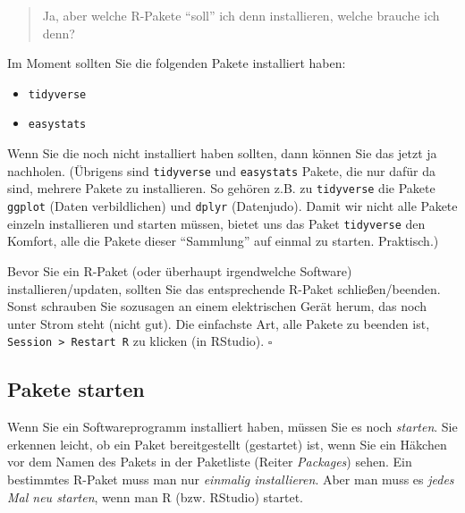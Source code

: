 \documentclass[
  letterpaper,
  oneside,
  open=any]{scrbook}
\providecommand{\tightlist}{%
  \setlength{\itemsep}{0pt}\setlength{\parskip}{0pt}}\usepackage{longtable,booktabs,array}
\theoremstyle{definition}
\theoremstyle{definition}
\theoremstyle{definition}
\theoremstyle{remark}
\begin{document}
\begin{quote}
{} Ja, aber welche R-Pakete \enquote{soll} ich denn
installieren, welche brauche ich denn?
\end{quote}

Im Moment sollten Sie die folgenden Pakete installiert haben:

\begin{itemize}
\tightlist
\item
  \texttt{tidyverse}
\item
  \texttt{easystats}
\end{itemize}

Wenn Sie die noch nicht installiert haben sollten, dann können Sie das
jetzt ja nachholen. (Übrigens sind \texttt{tidyverse} und
\texttt{easystats} Pakete, die nur dafür da sind, mehrere Pakete zu
installieren. So gehören z.B. zu \texttt{tidyverse} die Pakete
\texttt{ggplot} (Daten verbildlichen) und \texttt{dplyr} (Datenjudo).
Damit wir nicht alle Pakete einzeln installieren und starten müssen,
bietet uns das Paket \texttt{tidyverse} den Komfort, alle die Pakete
dieser \enquote{Sammlung} auf einmal zu starten. Praktisch.)

\begin{tcolorbox}[enhanced jigsaw, bottomrule=.15mm, left=2mm, colbacktitle=quarto-callout-caution-color!10!white, bottomtitle=1mm, colframe=quarto-callout-caution-color-frame, coltitle=black, rightrule=.15mm, breakable, toptitle=1mm, titlerule=0mm, title=\textcolor{quarto-callout-caution-color}{\faFire}\hspace{0.5em}{Vorsicht}, opacitybacktitle=0.6, arc=.35mm, colback=white, leftrule=.75mm, opacityback=0, toprule=.15mm]

Bevor Sie ein R-Paket (oder überhaupt irgendwelche Software)
installieren/updaten, sollten Sie das entsprechende R-Paket
schließen/beenden. Sonst schrauben Sie sozusagen an einem elektrischen
Gerät herum, das noch unter Strom steht (nicht gut). Die einfachste Art,
alle Pakete zu beenden ist, \texttt{Session\ \textgreater{}\ Restart\ R}
zu klicken (in RStudio). \(\square\)

\end{tcolorbox}

\subsection{Pakete starten}\label{pakete-starten}

Wenn Sie ein Softwareprogramm installiert haben, müssen Sie es noch
\emph{starten}. Sie erkennen leicht, ob ein Paket bereitgestellt
(gestartet) ist, wenn Sie ein Häkchen vor dem Namen des Pakets in der
Paketliste (Reiter \emph{Packages}) sehen. Ein bestimmtes R-Paket muss
man nur \emph{einmalig installieren}. Aber man muss es \emph{jedes Mal
neu starten}, wenn man R (bzw. RStudio) startet.
\end{document}

